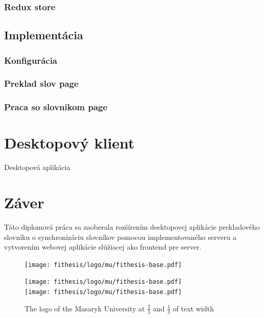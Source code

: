 \documentclass[
  digital, %
  table,   %
  lof,     %
  lot,     %
]{fithesis3}
\begin{document}
\subsection{Redux store}

\section{Implementácia}
\subsection{Konfigurácia}
\subsection{Preklad slov page}
\subsection{Praca so slovnikom page}

\chapter{Desktopový klient}

Desktopová aplikácia

\chapter{Záver}
Táto diplomová práca sa zaoberala rozšírením desktopovej aplikácie prekladového slovníku o synchronizáciu slovníkov pomocou implementovaného serveru a vytvorením webovej aplikácie slúžiacej ako frontend pre server.





\begin{figure}
  \begin{minipage}{.66\textwidth}
    \texttt{[image: fithesis/logo/mu/fithesis-base.pdf]}
  \end{minipage}
  \begin{minipage}{.33\textwidth}
    \texttt{[image: fithesis/logo/mu/fithesis-base.pdf]} \\
    \texttt{[image: fithesis/logo/mu/fithesis-base.pdf]}
  \end{minipage}
  \caption{The logo of the Masaryk University at $\frac23$ and
    $\frac13$ of text width}
  \label{fig:mulogo2}
\end{figure}
\end{document}
